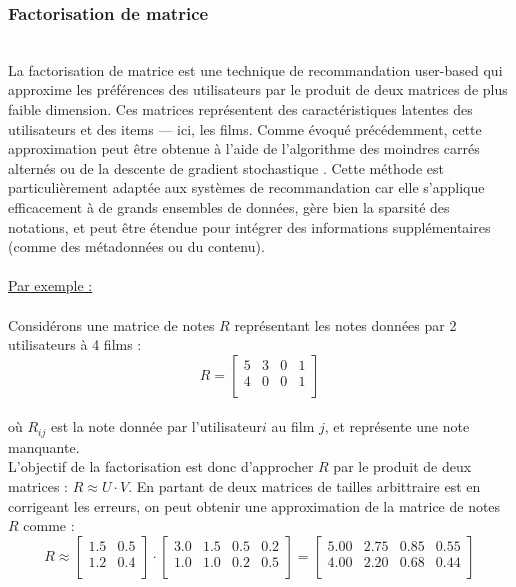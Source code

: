 \documentclass{article}
\begin{document}
\subsubsection{Factorisation de matrice}
$ $\\
La factorisation de matrice \cite{matrix_fac} est une technique de recommandation user-based qui approxime les préférences des utilisateurs par le produit de deux matrices de plus 
faible dimension. Ces matrices représentent des caractéristiques latentes des utilisateurs et des items — ici, les films. Comme évoqué précédemment, cette approximation peut être 
obtenue à l’aide de l’algorithme des moindres carrés alternés ou de la descente de gradient stochastique .
Cette méthode est particulièrement adaptée aux systèmes de recommandation car elle s’applique efficacement à de grands ensembles de données, gère bien la sparsité des notations, et 
peut être étendue pour intégrer des informations supplémentaires (comme des métadonnées ou du contenu).\\
\\
\underline{Par exemple :}\\
\\
Considérons une matrice de notes \( R \) représentant les notes données par 2 utilisateurs à 4 films :\\
\[R = 
\begin{bmatrix}
5 & 3 & 0 & 1 \\
4 & 0 & 0 & 1 \\
\end{bmatrix}
\]
\\
où \( R_{ij} \) est la note donnée par l'utilisateur\( i \) au film \( j \), et  représente une note manquante.\\
L'objectif de la factorisation est donc d'approcher \( R \) par le produit de deux matrices : \(R \approx U \cdot V\).
En partant de deux matrices de tailles arbittraire est en corrigeant les erreurs, on peut obtenir une approximation de la matrice de notes \( R \) comme :\\
\[
R \approx 
\begin{bmatrix}
1.5 & 0.5 \\
1.2 & 0.4 \\
\end{bmatrix}
\cdot
\begin{bmatrix}
3.0 & 1.5 & 0.5 & 0.2 \\
1.0 & 1.0 & 0.2 & 0.5 \\
\end{bmatrix}
=
\begin{bmatrix}
5.00 & 2.75 & 0.85 & 0.55 \\
4.00 & 2.20 & 0.68 & 0.44 \\
\end{bmatrix}
\] $ $\\
\end{document}
